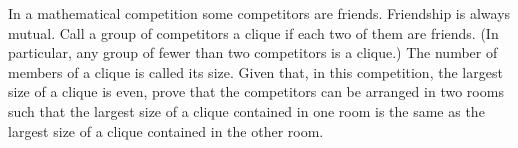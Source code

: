 
\item In a mathematical competition some competitors are friends. Friendship is always mutual. Call a group of competitors a clique if each two of them are friends. (In particular, any group of fewer than two competitors is a clique.) The number of members of a clique is called its size. Given that, in this competition, the largest size of a clique is even, prove that the competitors can be arranged in two rooms such that the largest size of a clique contained in one room is the same as the largest size of a clique contained in the other room.
